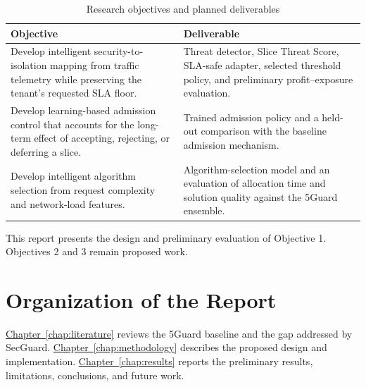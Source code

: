 \begin{table}[htbp]
\centering
\caption{Research objectives and planned deliverables}
\label{tab:objectives-deliverables}
\renewcommand{\arraystretch}{1.25}
\begin{tabular}{|p{}|p{}|}
\hline
\textbf{Objective} & \textbf{Deliverable} \\
\hline
Develop intelligent security-to-isolation mapping from traffic telemetry while preserving the tenant's requested SLA floor. & Threat detector, Slice Threat Score, SLA-safe adapter, selected threshold policy, and preliminary profit--exposure evaluation. \\
\hline
Develop learning-based admission control that accounts for the long-term effect of accepting, rejecting, or deferring a slice. & Trained admission policy and a held-out comparison with the baseline admission mechanism. \\
\hline
Develop intelligent algorithm selection from request complexity and network-load features. & Algorithm-selection model and an evaluation of allocation time and solution quality against the 5Guard ensemble. \\
\hline
\end{tabular}
\end{table}

This report presents the design and preliminary evaluation of Objective 1. Objectives 2 and 3 remain proposed work.
\section{Organization of the Report}\label{sec:intro-organization}
\hyperref[chap:literature]{Chapter~\ref*{chap:literature}} reviews the 5Guard baseline and the gap addressed by SecGuard. \hyperref[chap:methodology]{Chapter~\ref*{chap:methodology}} describes the proposed design and implementation. \hyperref[chap:results]{Chapter~\ref*{chap:results}} reports the preliminary results, limitations, conclusions, and future work.
